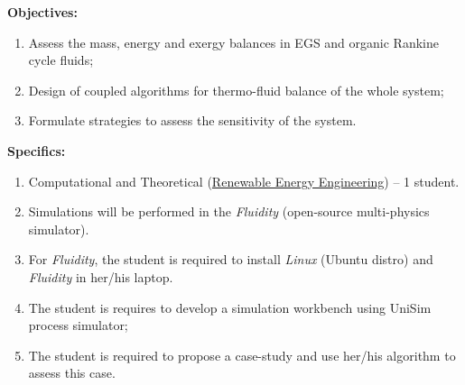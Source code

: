\documentclass[12pts,a4paper,amsmath,amssymb,floatfix]{article}%
\begin{document}
\begin{enumerate}[label=\bfseries Project:]
\noindent
{\bf Objectives:}
\begin{enumerate}
\item Assess the mass, energy and exergy balances in EGS and organic Rankine cycle fluids;
\item Design of coupled algorithms for thermo-fluid balance of the whole system;
\item Formulate strategies to assess the sensitivity of the system.%
\end{enumerate}

\noindent
{\bf Specifics:} 
\begin{enumerate}
\item Computational and Theoretical (\underline{Renewable Energy Engineering}) -- 1 student.
\item Simulations will be performed in the {\it Fluidity} (open-source multi-physics simulator). 
\item For {\it Fluidity}, the student is required to install {\it Linux} (Ubuntu distro) and {\it Fluidity} in her/his laptop. 
\item The student is requires to develop a simulation workbench using UniSim process simulator;
\item The student is required to propose a case-study and use her/his algorithm to assess this case.
\end{enumerate}


\end{enumerate}
\end{document}
